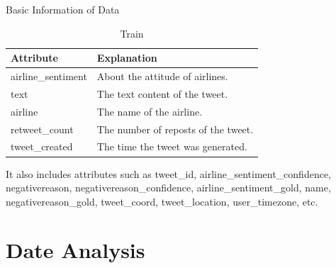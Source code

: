 \documentclass[
 size=14pt,
 paper=smartboard,  %
 mode=present, 		%
 display=slides, 	%
 style=tuliplab,  	%
 pauseslide,
 fleqn,leqno]{powerdot}
\begin{document}
\begin{slide}[toc=,bm=]{Basic Information of Data}
  
  \begin{table}[htbp]
  
    \caption{Train}
  
    \begin{tabular}{p{100pt} p{200pt}}\toprule
      Attribute & Explanation \\
         \midrule
         airline_sentiment
         & About the attitude of airlines. \\
         text
         & The text content of the tweet. \\
         airline
         & The name of the airline.  \\
         retweet_count
         & The number of reposts of the tweet.  \\
         tweet_created
         & The time the tweet was generated.  \\
        \bottomrule
    \end{tabular}
  \end{table}
  It also includes attributes such as tweet_id, 
  airline_sentiment_confidence, negativereason, 
  negativereason_confidence, airline_sentiment_gold, name, 
  negativereason_gold, tweet_coord, tweet_location, user_timezone, etc.

  \bigskip

\end{slide}


\section{Date Analysis}
\end{document}
